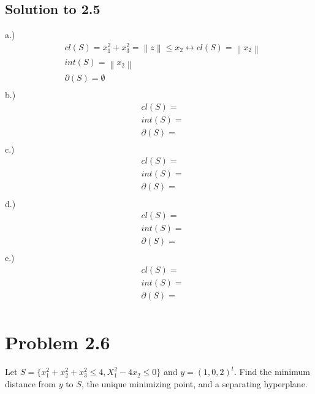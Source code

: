 \documentclass[12pt]{article}
\begin{document}
\subsection{Solution to 2.5}
\quad \quad \quad  \quad a.)\\
        \begin{align*}
            &cl(S) = x_1^2 + x_3^2 = \left\| z \right\| \leq x_2 \leftrightarrow cl(S) = \left\| x_2 \right\| \\
            &int(S) = \left\| x_2 \right\|\\
            &\partial(S) = \emptyset \\    
        \end{align*}
\quad \quad \quad  \quad b.)\\
        \begin{align*}
            &cl(S) = \\
            &int(S) = \\
            &\partial(S) = \\    
        \end{align*}
\quad \quad \quad  \quad c.)\\
        \begin{align*}
            &cl(S) = \\
            &int(S) = \\
            &\partial(S) = \\    
        \end{align*}
\quad \quad \quad  \quad d.)\\
        \begin{align*}
            &cl(S) = \\
            &int(S) = \\
            &\partial(S) = \\    
        \end{align*}   
\quad \quad \quad  \quad e.)\\
        \begin{align*}
            &cl(S) = \\
            &int(S) = \\
            &\partial(S) = \\    
        \end{align*}
        
\section{Problem 2.6}
Let $S = \{ x_1^2 + x_2^2 + x_3^2 \leq 4 , X_1^2 - 4x_2 \leq 0 \}$ and $y = (1, 0 , 2)^t$. Find the minimum distance from $y$ to $S$, the unique minimizing point, and a separating hyperplane.\\
\end{document}
